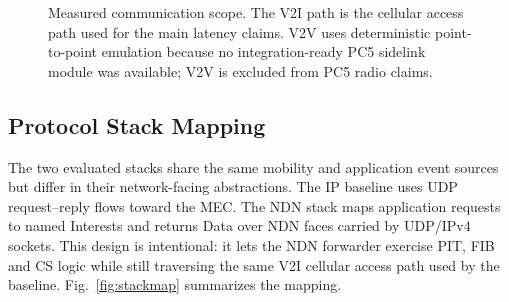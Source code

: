 \documentclass[journal]{IEEEtran}
\begin{document}
\begin{figure}[!t]\centering
{}
\caption{Measured communication scope. The V2I path is the cellular access path used for the main latency claims. V2V uses deterministic point-to-point emulation because no integration-ready PC5 sidelink module was available; V2V is excluded from PC5 radio claims.}
\label{fig:scope}
\end{figure}

\subsection{Protocol Stack Mapping}

The two evaluated stacks share the same mobility and application event sources but differ in their network-facing abstractions. The IP baseline uses UDP request--reply flows toward the MEC. The NDN stack maps application requests to named Interests and returns Data over NDN faces carried by UDP/IPv4 sockets. This design is intentional: it lets the NDN forwarder exercise PIT, FIB and CS logic while still traversing the same V2I cellular access path used by the baseline. Fig.~\ref{fig:stackmap} summarizes the mapping.
\end{document}
